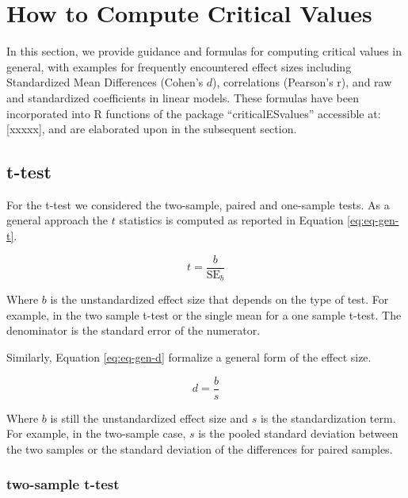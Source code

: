 \documentclass[
  man]{apa7}
\begin{document}
\hypertarget{how-to-compute-critical-values}{%
\section{How to Compute Critical Values}\label{how-to-compute-critical-values}}

In this section, we provide guidance and formulas for computing critical values in general, with examples for frequently encountered effect sizes including Standardized Mean Differences (Cohen's \(d\)), correlations (Pearson's r), and raw and standardized coefficients in linear models. These formulas have been incorporated into R functions of the package ``criticalESvalues'' accessible at: {[}xxxxx{]}, and are elaborated upon in the subsequent section.

\hypertarget{t-test}{%
\subsection{t-test}\label{t-test}}

For the t-test we considered the two-sample, paired and one-sample tests. As a general approach the \(t\) statistics is computed as reported in Equation \eqref{eq:eq-gen-t}.

\begin{equation}
    \label{eq:eq-gen-t}
    t = \frac{b}{\text{SE}_{b}}
\end{equation}

Where \(b\) is the unstandardized effect size that depends on the type of test. For example, in the two sample t-test or the single mean for a one sample t-test. The denominator is the standard error of the numerator.

Similarly, Equation \eqref{eq:eq-gen-d} formalize a general form of the effect size.

\begin{equation}
    \label{eq:eq-gen-d}
    d = \frac{b}{s}
\end{equation}

Where \(b\) is still the unstandardized effect size and \(s\) is the standardization term. For example, in the two-sample case, \(s\) is the pooled standard deviation between the two samples or the standard deviation of the differences for paired samples.

\hypertarget{two-sample-t-test}{%
\subsubsection{two-sample t-test}\label{two-sample-t-test}}
\end{document}
